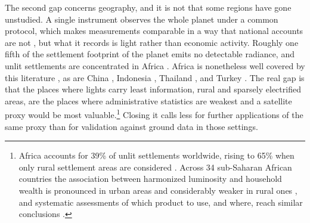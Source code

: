 \documentclass[
  a4paper, 
  twoside,
  final
]{article}
\begin{document}
The second gap concerns geography, and it is not that some regions have
gone unstudied. A single instrument observes the whole planet under a
common protocol, which makes measurements comparable in a way that
national accounts are not \citep{henderson_storeygard_weil_lights}, but
what it records is light rather than economic activity. Roughly one
fifth of the settlement footprint of the planet emits no detectable
radiance, and unlit settlements are concentrated in Africa
\citep{mccallum_unlit_settlements}. Africa is nonetheless well covered
by this literature \citep{kacou_africa_convergence}, as are China
\citep{glawe_mendez_china_luminosity}, Indonesia
\citep{miranti_mendez_indonesia}, Thailand
\citep{tipayalai_mendez_thailand}, and Turkey
\citep{ursavas_mendez_turkey}. The real gap is that the places where
lights carry least information, rural and sparsely electrified areas,
are the places where administrative statistics are weakest and a
satellite proxy would be most valuable.\footnote{Africa accounts for
  39\% of unlit settlements worldwide, rising to 65\% when only rural
  settlement areas are considered \citep{mccallum_unlit_settlements}.
  Across 34 sub-Saharan African countries the association between
  harmonized luminosity and household wealth is pronounced in urban
  areas and considerably weaker in rural ones
  \citep{jhamb_africa_nightlights}, and systematic assessments of which
  product to use, and where, reach similar conclusions
  \citep{gibson_etal_ntl_measurement}.} Closing it calls less for
further applications of the same proxy than for validation against
ground data in those settings.
\end{document}
